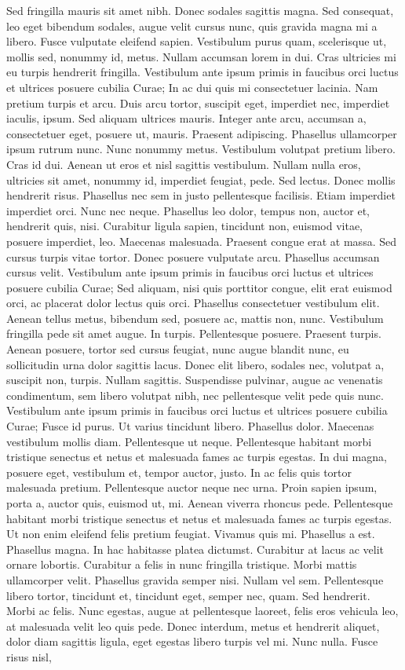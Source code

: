 Sed fringilla mauris sit amet nibh. Donec sodales sagittis magna. Sed consequat, leo eget bibendum sodales, augue velit cursus nunc, quis gravida magna mi a libero. Fusce vulputate eleifend sapien. Vestibulum purus quam, scelerisque ut, mollis sed, nonummy id, metus. Nullam accumsan lorem in dui. Cras ultricies mi eu turpis hendrerit fringilla. Vestibulum ante ipsum primis in faucibus orci luctus et ultrices posuere cubilia Curae; In ac dui quis mi consectetuer lacinia. Nam pretium turpis et arcu. Duis arcu tortor, suscipit eget, imperdiet nec, imperdiet iaculis, ipsum. Sed aliquam ultrices mauris. Integer ante arcu, accumsan a, consectetuer eget, posuere ut, mauris. Praesent adipiscing. Phasellus ullamcorper ipsum rutrum nunc. Nunc nonummy metus. Vestibulum volutpat pretium libero. Cras id dui. Aenean ut eros et nisl sagittis vestibulum. Nullam nulla eros, ultricies sit amet, nonummy id, imperdiet feugiat, pede. Sed lectus. Donec mollis hendrerit risus. Phasellus nec sem in justo pellentesque facilisis. Etiam imperdiet imperdiet orci. Nunc nec neque. Phasellus leo dolor, tempus non, auctor et, hendrerit quis, nisi. Curabitur ligula sapien, tincidunt non, euismod vitae, posuere imperdiet, leo. Maecenas malesuada. Praesent congue erat at massa. Sed cursus turpis vitae tortor. Donec posuere vulputate arcu. Phasellus accumsan cursus velit. Vestibulum ante ipsum primis in faucibus orci luctus et ultrices posuere cubilia Curae; Sed aliquam, nisi quis porttitor congue, elit erat euismod orci, ac placerat dolor lectus quis orci. Phasellus consectetuer vestibulum elit. Aenean tellus metus, bibendum sed, posuere ac, mattis non, nunc. Vestibulum fringilla pede sit amet augue. In turpis. Pellentesque posuere. Praesent turpis. Aenean posuere, tortor sed cursus feugiat, nunc augue blandit nunc, eu sollicitudin urna dolor sagittis lacus. Donec elit libero, sodales nec, volutpat a, suscipit non, turpis. Nullam sagittis. Suspendisse pulvinar, augue ac venenatis condimentum, sem libero volutpat nibh, nec pellentesque velit pede quis nunc. Vestibulum ante ipsum primis in faucibus orci luctus et ultrices posuere cubilia Curae; Fusce id purus. Ut varius tincidunt libero. Phasellus dolor. Maecenas vestibulum mollis diam. Pellentesque ut neque. Pellentesque habitant morbi tristique senectus et netus et malesuada fames ac turpis egestas. In dui magna, posuere eget, vestibulum et, tempor auctor, justo. In ac felis quis tortor malesuada pretium. Pellentesque auctor neque nec urna. Proin sapien ipsum, porta a, auctor quis, euismod ut, mi. Aenean viverra rhoncus pede. Pellentesque habitant morbi tristique senectus et netus et malesuada fames ac turpis egestas. Ut non enim eleifend felis pretium feugiat. Vivamus quis mi. Phasellus a est. Phasellus magna. In hac habitasse platea dictumst. Curabitur at lacus ac velit ornare lobortis. Curabitur a felis in nunc fringilla tristique. Morbi mattis ullamcorper velit. Phasellus gravida semper nisi. Nullam vel sem. Pellentesque libero tortor, tincidunt et, tincidunt eget, semper nec, quam. Sed hendrerit. Morbi ac felis. Nunc egestas, augue at pellentesque laoreet, felis eros vehicula leo, at malesuada velit leo quis pede. Donec interdum, metus et hendrerit aliquet, dolor diam sagittis ligula, eget egestas libero turpis vel mi. Nunc nulla. Fusce risus nisl, 